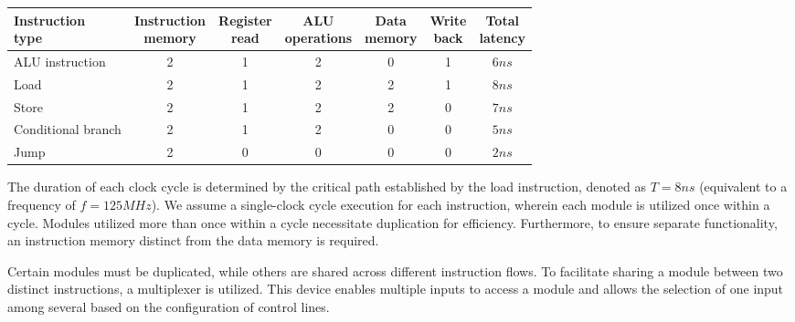 \begin{table}[H]
    \centering
    \begin{tabular}{l|ccccc|c}
    \makecell[l]{\textbf{Instruction} \\ \textbf{type}} & \makecell{\textbf{Instruction} \\ \textbf{memory}} & \makecell{\textbf{Register} \\ \textbf{read}} & \makecell{\textbf{ALU} \\ \textbf{operations}} & \makecell{\textbf{Data} \\ \textbf{memory}} & \makecell{\textbf{Write} \\ \textbf{back}} & \makecell{\textbf{Total} \\ \textbf{latency}} \\ \hline
    ALU instruction           & 2                           & 1                      & 2                       & 0                    & 1                   & $6ns$                  \\
    Load                      & 2                           & 1                      & 2                       & 2                    & 1                   & $8ns$                  \\
    Store                     & 2                           & 1                      & 2                       & 2                    & 0                   & $7ns$                  \\
    Conditional branch        & 2                           & 1                      & 2                       & 0                    & 0                   & $5ns$                  \\
    Jump                      & 2                           & 0                      & 0                       & 0                    & 0                   & $2ns$                 
    \end{tabular}
\end{table}

The duration of each clock cycle is determined by the critical path established by the load instruction, denoted as $T = 8 ns$ (equivalent to a frequency of $f = 125 MHz$).
We assume a single-clock cycle execution for each instruction, wherein each module is utilized once within a cycle. 
Modules utilized more than once within a cycle necessitate duplication for efficiency. 
Furthermore, to ensure separate functionality, an instruction memory distinct from the data memory is required.

Certain modules must be duplicated, while others are shared across different instruction flows.
To facilitate sharing a module between two distinct instructions, a multiplexer is utilized.
This device enables multiple inputs to access a module and allows the selection of one input among several based on the configuration of control lines.

